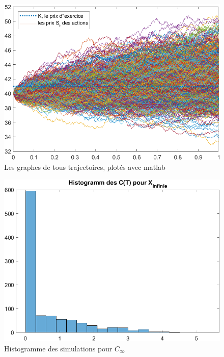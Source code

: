\documentclass[a4paper,12pt]{scrartcl}
\begin{document}
\begin{figure}[h!]
  \begin{center}
    \includegraphics[width=14cm]{"graphiques/S.png"}
    \caption{Les graphes de tous trajectoires, plotés avec matlab}
    \label{fig:S}
  \end{center}
\end{figure}

\begin{figure}[h!]
  \begin{center}
    \includegraphics[width=14cm]{"graphiques/hist_C_inf.png"}
    \caption{Histogramme des simulations pour $C_{\infty}$}
    \label{fig:hist_C_inf}
  \end{center}
\end{figure}
\end{document}

